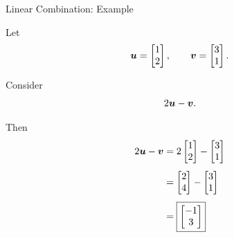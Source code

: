 \begin{frame}{Linear Combination: Example}

Let
\vspace{-0.1cm}
\[
\bm{u}
=
\begin{bmatrix}
1\\
2
\end{bmatrix},
\qquad
\bm{v}
=
\begin{bmatrix}
3\\
1
\end{bmatrix}.
\]

Consider
\vspace{-0.1cm}
\[
2\bm{u}-\bm{v}.
\]

Then
\vspace{-0.1cm}
\[
\begin{aligned}
2\bm{u}-\bm{v}
&=
2
\begin{bmatrix}
1\\
2
\end{bmatrix}
-
\begin{bmatrix}
3\\
1
\end{bmatrix}\\[4pt]
&=
\begin{bmatrix}
2\\
4
\end{bmatrix}
-
\begin{bmatrix}
3\\
1
\end{bmatrix}\\[4pt]
&=
\boxed{
\begin{bmatrix}
-1\\
3
\end{bmatrix}}
\end{aligned}
\]

\end{frame}



